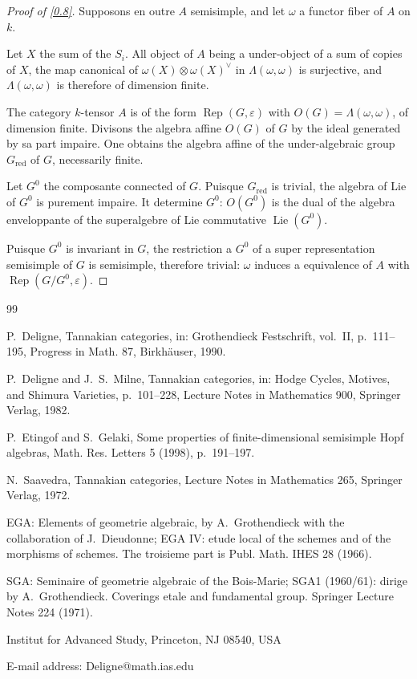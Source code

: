 \documentclass[11pt,a4paper]{article}
\theoremstyle{plain}
\theoremstyle{definition}
\newcommand{\Rep}{\operatorname{Rep}}
\begin{document}
\begin{proof}[Proof of \ref{0.8}]
Supposons en outre $A$ semisimple, and let $\omega$ a functor fiber of $A$ on $k$.

Let $X$ the sum of the $S_i$. All object of $A$ being a under-object of a sum of copies of $X$, the map canonical of $\omega(X)\otimes\omega(X)^\vee$ in $\Lambda(\omega,\omega)$ is surjective, and $\Lambda(\omega,\omega)$ is therefore of dimension finite.

The category $k$-tensor $A$ is of the form $\Rep(G,\varepsilon)$ with $O(G)=\Lambda(\omega,\omega)$, of dimension finite. Divisons the algebra affine $O(G)$ of $G$ by the ideal generated by sa part impaire. One obtains the algebra affine of the under-algebraic group $G_{\text{red}}$ of $G$, necessarily finite.

Let $G^0$ the composante connected of $G$. Puisque $G_{\text{red}}$ is trivial, the algebra of Lie of $G^0$ is purement impaire. It determine $G^0$: $O(G^0)$ is the dual of the algebra enveloppante of the superalgebre of Lie commutative $\operatorname{Lie}(G^0)$.

Puisque $G^0$ is invariant in $G$, the restriction a $G^0$ of a super representation semisimple of $G$ is semisimple, therefore trivial: $\omega$ induces a equivalence of $A$ with $\Rep(G/G^0,\varepsilon)$.
\end{proof}


\begin{thebibliography}{99}

P.~Deligne, Tannakian categories, in: Grothendieck Festschrift, vol.~II, p.~111--195, Progress in Math. 87, Birkh\"auser, 1990.

P.~Deligne and J.~S.~Milne, Tannakian categories, in: Hodge Cycles, Motives, and Shimura Varieties, p.~101--228, Lecture Notes in Mathematics 900, Springer Verlag, 1982.

P.~Etingof and S.~Gelaki, Some properties of finite-dimensional semisimple Hopf algebras, Math. Res. Letters 5 (1998), p.~191--197.

N.~Saavedra, Tannakian categories, Lecture Notes in Mathematics 265, Springer Verlag, 1972.

EGA: Elements of geometrie algebraic, by A.~Grothendieck with the collaboration of J.~Dieudonne; EGA IV: etude local of the schemes and of the morphisms of schemes. The troisieme part is Publ. Math. IHES 28 (1966).

SGA: Seminaire of geometrie algebraic of the Bois-Marie; SGA1 (1960/61): dirige by A.~Grothendieck. Coverings etale and fundamental group. Springer Lecture Notes 224 (1971).

\end{thebibliography}

\medskip
\noindent Institut for Advanced Study, Princeton, NJ 08540, USA

\noindent E-mail address: Deligne@math.ias.edu
\end{document}
